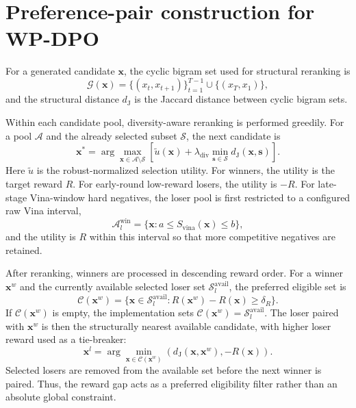\documentclass[12pt]{article}
\begin{document}
\section{Preference-pair construction for WP-DPO}
\label{supsec:preference_pairing}

For a generated candidate $\mathbf{x}$, the cyclic bigram set used for structural reranking is
\begin{equation}
\mathcal{G}(\mathbf{x})
=\{(x_t,x_{t+1})\}_{t=1}^{T-1}\cup\{(x_T,x_1)\},
\label{eq:sup_cyclic_bigrams}
\end{equation}
and the structural distance $d_{\mathrm{J}}$ is the Jaccard distance between cyclic bigram sets.

Within each candidate pool, diversity-aware reranking is performed greedily.
For a pool $\mathcal{A}$ and the already selected subset $\mathcal{S}$, the next candidate is
\begin{equation}
\mathbf{x}^{*}
=\arg\max_{\mathbf{x}\in\mathcal{A}\setminus\mathcal{S}}
\left[
\tilde{u}(\mathbf{x})
+\lambda_{\mathrm{div}}
\min_{\mathbf{s}\in\mathcal{S}}d_{\mathrm{J}}(\mathbf{x},\mathbf{s})
\right].
\label{eq:sup_mmr_selection}
\end{equation}
Here $\tilde{u}$ is the robust-normalized selection utility.
For winners, the utility is the target reward $R$.
For early-round low-reward losers, the utility is $-R$.
For late-stage Vina-window hard negatives, the loser pool is first restricted to a configured raw Vina interval,
\begin{equation}
\mathcal{A}_{l}^{\mathrm{win}}
=\{\mathbf{x}: a\leq S_{\mathrm{vina}}(\mathbf{x})\leq b\},
\label{eq:sup_vina_window}
\end{equation}
and the utility is $R$ within this interval so that more competitive negatives are retained.

After reranking, winners are processed in descending reward order.
For a winner $\mathbf{x}^{w}$ and the currently available selected loser set $\mathcal{S}_{l}^{\mathrm{avail}}$, the preferred eligible set is
\begin{equation}
\mathcal{C}(\mathbf{x}^{w})
=\{\mathbf{x}\in\mathcal{S}_{l}^{\mathrm{avail}}:
R(\mathbf{x}^{w})-R(\mathbf{x})\geq\delta_{R}\}.
\label{eq:sup_gap_filter}
\end{equation}
If $\mathcal{C}(\mathbf{x}^{w})$ is empty, the implementation sets
$\mathcal{C}(\mathbf{x}^{w})=\mathcal{S}_{l}^{\mathrm{avail}}$.
The loser paired with $\mathbf{x}^{w}$ is then the structurally nearest available candidate, with higher loser reward used as a tie-breaker:
\begin{equation}
\mathbf{x}^{l}
=\arg\min_{\mathbf{x}\in\mathcal{C}(\mathbf{x}^{w})}
\left(d_{\mathrm{J}}(\mathbf{x},\mathbf{x}^{w}), -R(\mathbf{x})\right).
\label{eq:sup_hard_negative_pair}
\end{equation}
Selected losers are removed from the available set before the next winner is paired.
Thus, the reward gap acts as a preferred eligibility filter rather than an absolute global constraint.
\end{document}
